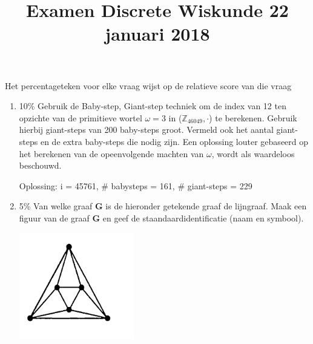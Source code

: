 \documentclass{article}
\def\note#1{\color{cyan} #1 \color{black}}
\begin{document}
\title{Examen Discrete Wiskunde 22 januari 2018}
\date{}
\author{}
\maketitle

\note{Het percentageteken voor elke vraag wijst op de relatieve score van die vraag}

\begin{enumerate}
\item {\note{10\%} Gebruik de Baby-step, Giant-step techniek om de index van 12 ten opzichte van de primitieve wortel $\omega = 3$ in ($\mathbb{Z}_{46049}, \cdot$) te berekenen. Gebruik hierbij giant-steps van 200 baby-steps groot. Vermeld ook het aantal giant-steps en de extra baby-steps die nodig zijn. Een oplossing louter gebaseerd op het berekenen van de opeenvolgende machten van $\omega$, wordt als waardeloos beschouwd. 

\note{Oplossing: i = 45761, \# babysteps = 161, \# giant-steps = 229}}

\item {\note{5\%} Van welke graaf {\bf G} is de hieronder getekende graaf de lijngraaf. Maak een figuur van de graaf {\bf G} en geef de staandaardidentificatie (naam en symbool).

    \includegraphics[width=5cm]{lijngraaf}}


\end{enumerate}
\end{document}
